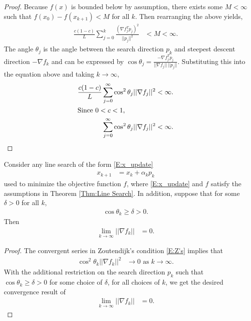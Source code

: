 \begin{proof}
Because $f(x)$ is bounded below by assumption, there exists some $M < \infty$ such that $f(x_0) - f(x_{k+1}) < M$ for all $k$. Then rearranging the above yields,
\begin{align*}
	\frac{c( 1 - c )}{L} \sum_{j=0}^{k}   \frac{ ( \nabla f_j^T p_j )^2}{ || p_j ||^2 } &< M < \infty.
 \end{align*}
The angle $\theta_j$ is the angle between the search direction $p_k$ and steepest descent direction $-\nabla f_k$ and can be expressed by $\cos \theta_j = \frac{ -\nabla f_j^T p_j}{||\nabla f_j|| \, || p_j||}$.  Substituting this into the equation above and taking $k \to \infty$,
\begin{align*}
	\frac{c( 1 - c )}{L} \sum_{j=0}^{\infty}  \cos^2 \theta_j ||\nabla f_j||^2 &< \infty.\\
	\intertext{Since $0 < c < 1$,}
	\sum_{j=0}^{\infty}  \cos^2 \theta_j ||\nabla f_j||^2 &< \infty. 
\end{align*}
\end{proof}

\begin{corollary} \label{Cor:Convergence}
Consider any line search of the form \eqref{E:x_update} 
\begin{align*}
	x_{k+1} &= x_k + \alpha_k p_k 
\end{align*}
used to minimize the objective function $f$, where \eqref{E:x_update} and $f$ satisfy the assumptions in Theorem \eqref{Thm:Line Search}.  In addition, suppose that for some $\delta > 0$ for all $k$,  
\begin{align*}
\cos \theta_k \geq \delta > 0.
\end{align*}
 Then 
\begin{align*}
	\lim_{k \to \infty} || \nabla f_k || &= 0.
\end{align*}
\end{corollary}

\begin{proof}
The convergent series in Zoutendijk's condition \eqref{E:Z's} implies that 
\begin{align*}
	\cos^2 \theta_k || \nabla f_k ||^2 &\to 0 \text{ as } k \to \infty.
\end{align*}
With the additional restriction on the search direction $p_k$ such that $\cos \theta_k \geq \delta > 0$ for some choice of $\delta$, for all choices of $k$, we get the desired convergence result of
\begin{align*}
	\lim_{k \to \infty} || \nabla f_k || &= 0.
\end{align*}
\end{proof}


